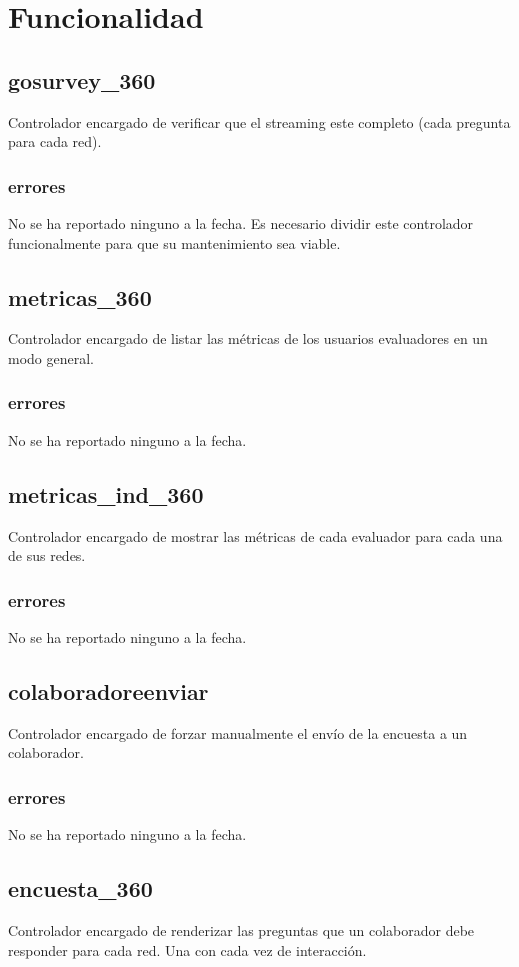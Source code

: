 \documentclass[10pt,a4paper]{book}
\begin{document}
	\section{Funcionalidad}


	\subsection{gosurvey\_360}
	Controlador encargado de verificar que el streaming este completo (cada pregunta para cada red).
	\subsubsection{errores}
	No se ha reportado ninguno a la fecha. Es necesario dividir este controlador funcionalmente para que su mantenimiento sea viable.

	\subsection{metricas\_360}
	Controlador encargado de listar las métricas de los usuarios evaluadores en un modo general.
	\subsubsection{errores}
	No se ha reportado ninguno a la fecha.

	\subsection{metricas\_ind\_360}
	Controlador encargado de mostrar las métricas de cada evaluador para cada una de sus redes.
	\subsubsection{errores}
	No se ha reportado ninguno a la fecha.

	\subsection{colaboradoreenviar}
	Controlador encargado de forzar manualmente el envío de la encuesta a un colaborador.
	\subsubsection{errores}
	No se ha reportado ninguno a la fecha.

	\subsection{encuesta\_360}
	Controlador encargado de renderizar las preguntas que un colaborador debe responder para cada red. Una con cada vez de interacción.
\end{document}
